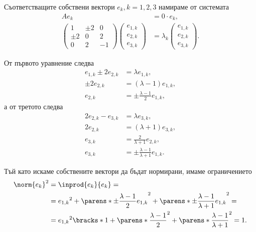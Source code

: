 \documentclass{../../common/topic}
\begin{document}
\begin{solution}
  Съответстващите собствени вектори \( e_k, k = 1, 2, 3 \) намираме от системата
  \begingroup
  \allowdisplaybreaks
  \begin{align*}
    A e_k &= 0 \cdot e_k,
    \\
    \begin{pmatrix}
      1 & \pm 2 & 0 \\
      \pm 2 & 0 & 2 \\
      0 & 2 & -1
    \end{pmatrix}
    \begin{pmatrix}
      e_{1,k} \\ e_{2,k} \\ e_{3,k}
    \end{pmatrix}
    &=
    \lambda_k
    \begin{pmatrix}
      e_{1,k} \\ e_{2,k} \\ e_{3,k}
    \end{pmatrix}.
  \end{align*}
  \endgroup

  От първото уравнение следва
  \begin{align*}
    e_{1,k} \pm 2 e_{2,k} &= \lambda e_{1,k},
    \\
    \pm 2 e_{2,k} &= (\lambda - 1) e_{1,k},
    \\
    e_{2,k} &= \pm \frac {\lambda - 1} 2 e_{1,k},
  \end{align*}
  а от третото следва
  \begin{align*}
    2e_{2,k} - e_{3,k} &= \lambda e_{3,k},
    \\
    2 e_{2,k} &= (\lambda + 1) e_{3,k},
    \\
    e_{3,k} &= \frac 2 {\lambda + 1} e_{2,k},
    \\
    e_{3,k} &= \pm \frac {\lambda - 1} {\lambda + 1} e_{1,k}.
  \end{align*}

  Тъй като искаме собствените вектори да бъдат нормирани, имаме ограничението
  \begin{align*}
    {\norm{e_k}}^2
    &=
    \inprod{e_k} {e_k}
    = \\ &=
    {e_{1,k}}^2 + {\parens*{\pm \frac {\lambda - 1} 2 e_{1,k} }}^2 + {\parens*{\pm \frac {\lambda - 1} {\lambda + 1} e_{1,k} }}^2
    = \\ &=
    {e_{1,k}}^2 \bracks*{1 + {\parens*{\frac {\lambda - 1} 2 }}^2 + {\parens*{\frac {\lambda - 1} {\lambda + 1} }}^2 }
    =
    1.
  \end{align*}


\end{solution}
\end{document}

